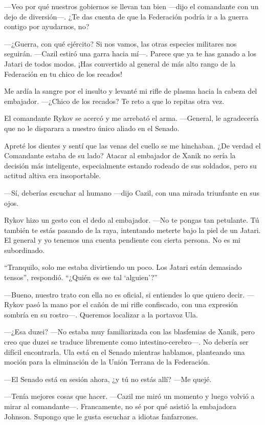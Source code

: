 —Veo por qué nuestros gobiernos se llevan tan bien —dijo el comandante con un dejo de diversión—. ¿Te das cuenta de que la Federación podría ir a la guerra contigo por ayudarnos, no?

—¿Guerra, con qué ejército? Si nos vamos, las otras especies militares nos seguirán. —Cazil estiró una garra hacia mí—. Parece que ya te has ganado a los Jatari de todos modos. ¡Has convertido al general de más alto rango de la Federación en tu chico de los recados!

Me ardía la sangre por el insulto y levanté mi rifle de plasma hacia la cabeza del embajador. —¿Chico de los recados? Te reto a que lo repitas otra vez.

El comandante Rykov se acercó y me arrebató el arma. —General, le agradecería que no le disparara a nuestro único aliado en el Senado.

Apreté los dientes y sentí que las venas del cuello se me hinchaban. ¿De verdad el Comandante estaba de su lado? Atacar al embajador de Xanik no sería la decisión más inteligente, especialmente estando rodeado de sus soldados, pero su actitud altiva era insoportable.

—Sí, deberías escuchar al humano —dijo Cazil, con una mirada triunfante en sus ojos.

Rykov hizo un gesto con el dedo al embajador. —No te pongas tan petulante. Tú también te estás pasando de la raya, intentando meterte bajo la piel de un Jatari. El general y yo tenemos una cuenta pendiente con cierta persona. No es mi subordinado.

``Tranquilo, solo me estaba divirtiendo un poco. Los Jatari están demasiado tensos'', respondió. ``¿Quién es ese tal ‘alguien’?''


—Bueno, nuestro trato con ella no es oficial, si entiendes lo que quiero decir. —Rykov pasó la mano por el cañón de mi rifle confiscado, con una expresión sombría en su rostro—. Queremos localizar a la portavoz Ula.

—¿Esa duzei? —No estaba muy familiarizada con las blasfemias de Xanik, pero creo que duzei se traduce libremente como intestino-cerebro—. No debería ser difícil encontrarla. Ula está en el Senado mientras hablamos, planteando una moción para la eliminación de la Unión Terrana de la Federación.

—El Senado está en sesión ahora, ¿y tú no estás allí? —Me quejé.

—Tenía mejores cosas que hacer. —Cazil me miró un momento y luego volvió a mirar al comandante—. Francamente, no sé por qué asistió la embajadora Johnson. Supongo que le gusta escuchar a idiotas fanfarrones.

